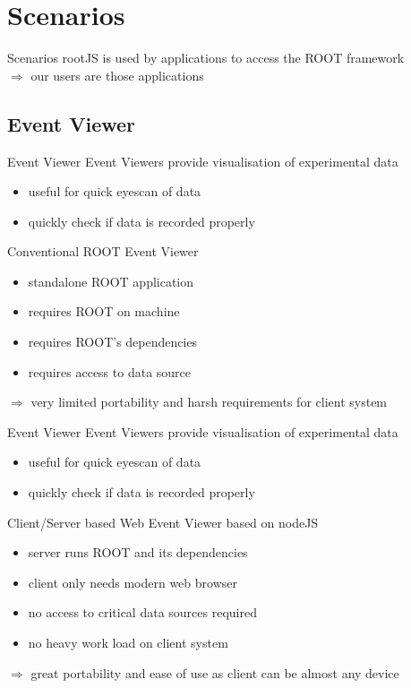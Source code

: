 \section{Scenarios}
\begin{frame}{Scenarios}
rootJS is used by applications to access the ROOT framework\\
\pause $\Rightarrow $ our users are those applications
\end{frame}

\subsection{Event Viewer}
\begin{frame}{Event Viewer}
 \pause   Event Viewers provide visualisation of experimental data
  \begin{itemize}
    \pause \item useful for quick eyescan of data
    \pause \item quickly check if data is recorded properly
  \end{itemize}
  \pause
  \medskip
   Conventional ROOT Event Viewer
  \begin{itemize}
  \pause \item standalone ROOT application
   \pause \item requires ROOT on machine
   \pause \item requires ROOT's dependencies
   \pause \item requires access to data source
   \end{itemize}
   \pause $\Rightarrow $ very limited portability and harsh requirements for client system
\end{frame}

\begin{frame}{Event Viewer}
 Event Viewers provide visualisation of experimental data
  \begin{itemize}
   \item useful for quick eyescan of data
   \item quickly check if data is recorded properly
  \end{itemize}
   \medskip
   Client/Server based Web Event Viewer based on nodeJS
  \begin{itemize}
  \pause \item server runs ROOT and its dependencies
   \pause \item client only needs modern web browser
   \pause \item no access to critical data sources required
   \pause \item no heavy work load on client system
   \end{itemize}
   \pause $\Rightarrow $ great portability and ease of use as client can be almost any device
\end{frame}


